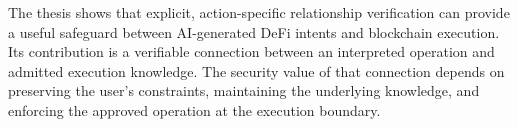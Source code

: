 The thesis shows that explicit, action-specific relationship verification
can provide a useful safeguard between AI-generated DeFi intents and
blockchain execution. Its contribution is a verifiable connection between
an interpreted operation and admitted execution knowledge. The security
value of that connection depends on preserving the user's constraints,
maintaining the underlying knowledge, and enforcing the approved
operation at the execution boundary.